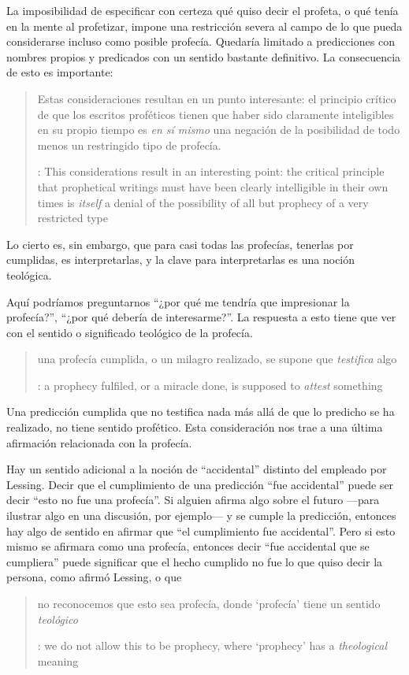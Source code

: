 La imposibilidad de especificar con certeza qué quiso decir el profeta, o qué
tenía en la mente al profetizar, impone una restricción severa al campo de lo
que pueda considerarse incluso como posible profecía. Quedaría limitado a
predicciones con nombres propios y predicados con un sentido bastante
definitivo. La consecuencia de esto es importante:
\blockquote[{\cite[31]{anscombe2008faith:prophandmi}}: This considerations
result in an interesting point: the critical principle that prophetical writings
must have been clearly intelligible in their own times is \emph{itself} a denial
of the possibility of all but prophecy of a very restricted type]{Estas
  consideraciones resultan en un punto interesante: el principio crítico de que
  los escritos proféticos tienen que haber sido claramente inteligibles en su
  propio tiempo es \emph{en sí mismo} una negación de la posibilidad de todo
  menos un restringido tipo de profecía.}
Lo cierto es, sin embargo, que para casi todas las profecías, tenerlas por
cumplidas, es interpretarlas, y la clave para interpretarlas es una noción
teológica.

Aquí podríamos preguntarnos \enquote{¿por qué me tendría que impresionar la
  profecía?}, \enquote{¿por qué debería de interesarme?}. La respuesta a esto
tiene que ver con el sentido o significado teológico de la profecía.
\blockquote[{\cite[32]{anscombe2008faith:prophandmi}}: a prophecy fulfiled, or a
miracle done, is supposed to \emph{attest} something]{una profecía cumplida, o
  un milagro realizado, se supone que \emph{testifica} algo}. Una predicción
cumplida que no testifica nada más allá de que lo predicho se ha realizado, no
tiene sentido profético. Esta consideración nos trae a una última afirmación
relacionada con la profecía.

Hay un sentido adicional a la noción de \enquote{accidental} distinto del
empleado por Lessing. Decir que el cumplimiento de una predicción \enquote{fue
  accidental} puede ser decir \enquote {esto no fue una profecía}. Si alguien
afirma algo sobre el futuro ---para ilustrar algo en una discusión, por
ejemplo--- y se cumple la predicción, entonces hay algo de sentido en afirmar
que \enquote{el cumplimiento fue accidental}. Pero si esto mismo se afirmara
como una profecía, entonces decir \enquote{fue accidental que se cumpliera}
puede significar que el hecho cumplido no fue lo que quiso decir la persona,
como afirmó Lessing, o que
\blockquote[{\cite[34]{anscombe2008faith:prophandmi}}: we do not allow this to
be prophecy, where `prophecy' has a \emph{theological} meaning]{no reconocemos
  que esto sea profecía, donde `profecía' tiene un sentido \emph{teológico}}.

